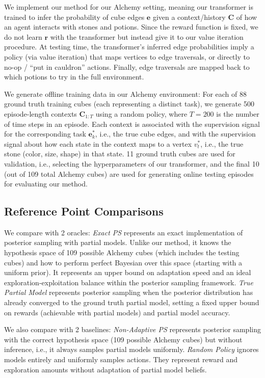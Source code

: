 \documentclass[sigconf]{aamas}
\begin{document}
We implement our method for our Alchemy setting, meaning our transformer is trained to infer the probability of cube edges $\mathbf{e}$ given a context/history $\mathbf{C}$ of how an agent interacts with stones and potions. Since the reward function is fixed, we do not learn $\mathbf{r}$ with the transformer but instead give it to our value iteration procedure. At testing time, the transformer's inferred edge probabilities imply a policy (via value iteration) that maps vertices to edge traversals, or directly to no-op / ``put in cauldron'' actions. Finally, edge traversals are mapped back to which potions to try in the full environment.

We generate offline training data in our Alchemy environment: For each of 88 ground truth training cubes (each representing a distinct task), we generate 500 episode-length contexts $\mathbf{C}_{1:T}$ using a random policy, where $T=200$ is the number of time steps in an episode. Each context is associated with the supervision signal for the corresponding task $\mathbf{e}^*_k$, i.e., the true cube edges, and with the supervision signal about how each state in the context maps to a vertex $v_t^*$, i.e., the true stone (color, size, shape) in that state. 11 ground truth cubes are used for validation, i.e., selecting the hyperparameters of our transformer, and the final 10 (out of 109 total Alchemy cubes) are used for generating online testing episodes for evaluating our method.

\subsection{Reference Point Comparisons}\label{sec:refer-point-comp}
We compare with 2 oracles: \textit{Exact PS} represents an exact implementation of posterior sampling with partial models. Unlike our method, it knows the hypothesis space of 109 possible Alchemy cubes (which includes the testing cubes) and how to perform perfect Bayesian over this space (starting with a uniform prior). It represents an upper bound on adaptation speed and an ideal exploration-exploitation balance within the posterior sampling framework. \textit{True Partial Model} represents posterior sampling when the posterior distribution has already converged to the ground truth partial model, setting a fixed upper bound on rewards (achievable with partial models) and partial model accuracy.

We also compare with 2 baselines: \textit{Non-Adaptive PS} represents posterior sampling with the correct hypothesis space (109 possible Alchemy cubes) but without inference, i.e., it always samples partial models uniformly. \textit{Random Policy} ignores models entirely and uniformly samples actions. They represent reward and exploration amounts without adaptation of partial model beliefs.
\end{document}
